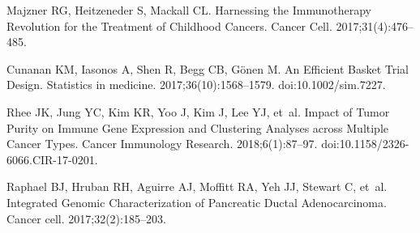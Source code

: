 \documentclass[10pt,letterpaper]{article}
\begin{document}
\begin{thebibliography}{10}
Majzner RG, Heitzeneder S, Mackall CL.
\newblock Harnessing the Immunotherapy Revolution for the Treatment of
Childhood Cancers.
\newblock Cancer Cell. 2017;31(4):476--485.

Cunanan KM, Iasonos A, Shen R, Begg CB, G{\"o}nen M.
\newblock An {{Efficient Basket Trial Design}}.
\newblock Statistics in medicine. 2017;36(10):1568--1579.
\newblock doi:{10.1002/sim.7227}.

Rhee JK, Jung YC, Kim KR, Yoo J, Kim J, Lee YJ, et~al.
\newblock Impact of {{Tumor Purity}} on {{Immune Gene Expression}} and
{{Clustering Analyses}} across {{Multiple Cancer Types}}.
\newblock Cancer Immunology Research. 2018;6(1):87--97.
\newblock doi:{10.1158/2326-6066.CIR-17-0201}.

Raphael BJ, Hruban RH, Aguirre AJ, Moffitt RA, Yeh JJ, Stewart C, et~al.
\newblock Integrated Genomic Characterization of Pancreatic Ductal
Adenocarcinoma.
\newblock Cancer cell. 2017;32(2):185--203.

\end{thebibliography}
\end{document}
